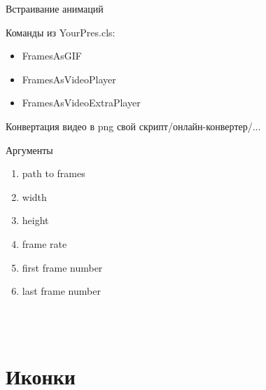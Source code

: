 \documentclass{YourPres}
\begin{document}
  \begin{frame}{Встраивание анимаций}\vspace*{-0.5cm}
    \begin{minipage}[t]{0.54\linewidth}
      \begin{block}{Команды из YourPres.cls:}
      { \Yourcode
        \begin{itemize}
          \item  FramesAsGIF
          \item  FramesAsVideoPlayer
          \item  FramesAsVideoExtraPlayer
        \end{itemize}
      }
      \end{block}\vfill
      \begin{block}{Конвертация видео в png}
        свой скрипт/онлайн-конвертер/...
      \end{block}
    \end{minipage}\hfill
    \begin{minipage}[t]{0.4\linewidth}
      \begin{block}{Аргументы}
        \begin{enumerate}
          \item path to frames
          \item width
          \item height
          \item frame rate
          \item first frame number
          \item last frame number
        \end{enumerate}
      \end{block}\vspace{-0.2cm}
    \end{minipage}
    \mbox{ }\vspace{0.2cm}\\
    \hfill
    \hfill
    \hspace{0.45cm}\mbox{ }
  \end{frame}

  \section{Иконки}
\end{document}
